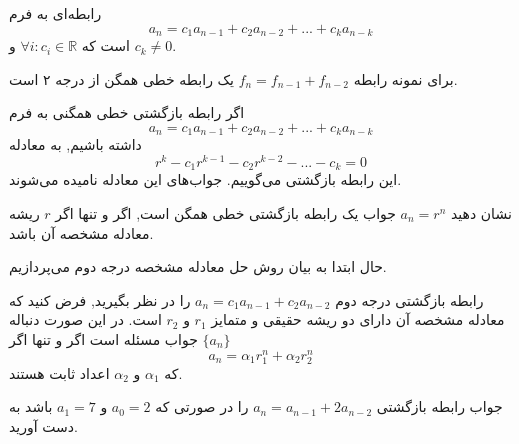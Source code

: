 \begin{DEFINITION}
    \p
    رابطه‌ای به فرم
   \[a_n=c_{1}a_{n-1}+c_{2}a_{n-2}+...+c_{k}a_{n-k}\]
   است که
   $\forall{i}:c_i \in \mathbb{R} $
   و 
   $ c_k\neq 0$.


\end{DEFINITION}

\p
برای نمونه رابطه‌ 
$f_n=f_{n-1}+f_{n-2}$
یک رابطه‌ خطی همگن از درجه ۲ است.

\begin{DEFINITION}
    \p
    اگر رابطه‌ بازگشتی خطی همگنی به فرم
    \[a_n=c_{1}a_{n-1}+c_{2}a_{n-2}+...+c_{k}a_{n-k}\]
    داشته باشیم, به معادله
    \[r^k-c_{1}r^{k-1}-c_{2}r^{k-2}-...-c_{k}=0\]
     این رابطه‌ بازگشتی می‌گوییم.
     جواب‌های این معادله 
    نامیده می‌شوند.

\end{DEFINITION}
\begin{PROBLEM}
    \p
    نشان دهید
    $a_n=r^n$
    جواب یک رابطه‌ بازگشتی خطی همگن است, اگر و تنها اگر 
    $r$
    ریشه معادله مشخصه آن باشد.
\end{PROBLEM}
\p
حال
ابتدا به بیان روش حل معادله مشخصه درجه دوم می‌پردازیم.
\begin{THEOREM}
    \p
    رابطه‌ بازگشتی درجه دوم
    $a_n=c_1 a_{n-1}+c_2 a_{n-2}$
    را در نظر بگیرید, فرض کنید که معادله مشخصه آن دارای دو ریشه حقیقی و متمایز 
    $r_1$ و $r_2$
    است.
    در این صورت دنباله 
    $\{a_n\}$
    جواب مسئله است اگر و تنها اگر
    \[a_n=\alpha_1 r_1^n+\alpha_2 r_2^n\]
    که
    $\alpha_1$
    و
    $\alpha_2$
    اعداد ثابت هستند.

\end{THEOREM}
\begin{PROBLEM}
    \p
    جواب رابطه‌ بازگشتی 
    $a_n=a_{n-1}+2a_{n-2}$
    را در صورتی که
    $a_0=2$
    و
    $a_1=7$
    باشد به دست آورید.
\end{PROBLEM}
